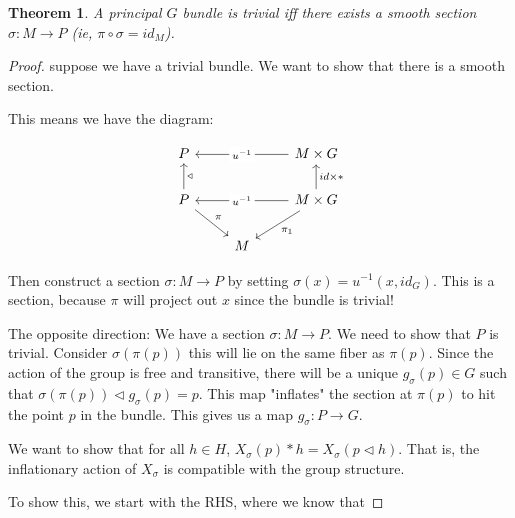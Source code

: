 \documentclass[11pt]{book}
\newtheorem{theorem}{Theorem}
\newtheorem{proof}[theorem]{Proof}
\begin{document}
\begin{theorem}
A principal $G$ bundle is trivial iff there exists a smooth section $\sigma:M \rightarrow P$
(ie, $\pi \circ \sigma = id_M$).
\end{theorem}
\begin{proof}
suppose we have a trivial bundle. We want to show that there is a smooth section.

This means we have the diagram:

\[\begin{tikzcd}
	P & {} & {M \times G} \\
	P && {M\times G} \\
	& M
	\arrow["\triangleleft"', from=2-1, to=1-1]
	\arrow["{id \times *}"', from=2-3, to=1-3]
	\arrow["{\pi_1}", from=2-3, to=3-2]
	\arrow["\pi", from=2-1, to=3-2]
	\arrow["{u^{-1}}"{description}, from=2-3, to=2-1]
	\arrow["{u^{-1}}"{description}, from=1-3, to=1-1]
\end{tikzcd}\]

Then construct a section $\sigma: M \rightarrow P$ by setting $\sigma(x) = u^{-1}(x, id_G)$.
This is a section, because $\pi$ will project out $x$ since the bundle is trivial!


The opposite direction: We have a section $\sigma: M \rightarrow P$. We need to show that
$P$ is trivial. Consider $\sigma(\pi(p))$ this will lie on the same fiber as $\pi(p)$.
Since the action of the group is free and transitive, there will be a unique $g_\sigma(p) \in G$
such that $\sigma(\pi(p)) \triangleleft g_\sigma(p) = p$. This map "inflates" the section at $\pi(p)$
to hit the point $p$ in the bundle. This gives us a map $g_\sigma: P \rightarrow G$.


We want to show that for all $h \in H$,
$X_\sigma(p) * h = X_\sigma(p \triangleleft h)$.
That is, the inflationary action of $X_\sigma$ is compatible with the group structure.

To show this, we start with the RHS, where we know that


\end{proof}
\end{document}
